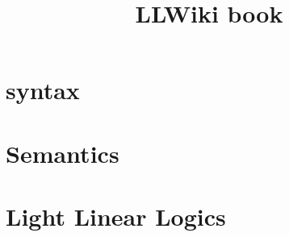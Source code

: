 \documentclass[a4paper,11pt]{book}
\title{LLWiki book}
\begin{document}
\maketitle

\tableofcontents

\newpage

\part{syntax}


\newpage

\newpage

\newpage

\newpage


\newpage

\newpage


\newpage


\newpage







\newpage




\part{Semantics}








\newpage




\newpage


\part{Light Linear Logics}


\end{document}
